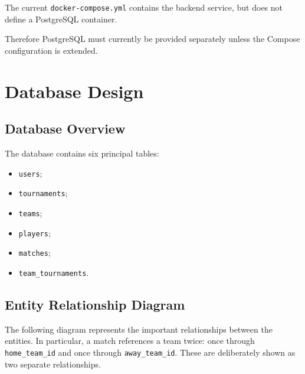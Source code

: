 \documentclass[12pt,a4paper]{article}
\begin{document}
The current \texttt{docker-compose.yml} contains the backend service,
but does not define a PostgreSQL container.

Therefore PostgreSQL must currently be provided separately unless
the Compose configuration is extended.


\section{Database Design}

\subsection{Database Overview}

The database contains six principal tables:

\begin{itemize}
    \item \texttt{users};
    \item \texttt{tournaments};
    \item \texttt{teams};
    \item \texttt{players};
    \item \texttt{matches};
    \item \texttt{team\_tournaments}.
\end{itemize}

\subsection{Entity Relationship Diagram}

The following diagram represents the important relationships between
the entities. In particular, a match references a team twice:
once through \texttt{home\_team\_id} and once through
\texttt{away\_team\_id}. These are deliberately shown as two separate
relationships.
\end{document}
